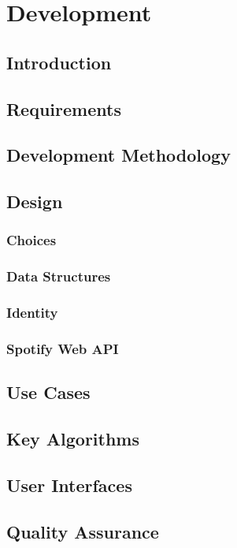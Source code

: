 \chapter{Development}
\section{Introduction}

\section{Requirements}

\section{Development Methodology}

\section{Design}
\subsection{Choices}



\subsection{Data Structures}



\subsection{Identity}

\subsection{Spotify Web API}

\section{Use Cases}

\section{Key Algorithms}

\section{User Interfaces}

\section{Quality Assurance}

